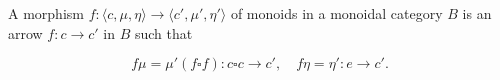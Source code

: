 A morphism $f: \langle c, \mu, \eta \rangle \rightarrow \langle c', \mu', \eta' \rangle$ of monoids in a monoidal category $B$ is an arrow $f: c \rightarrow c'$ in $B$ such that

$$f\mu = \mu'(f \square f): c \square c \rightarrow c', \quad f\eta = \eta' : e \rightarrow c'.$$
